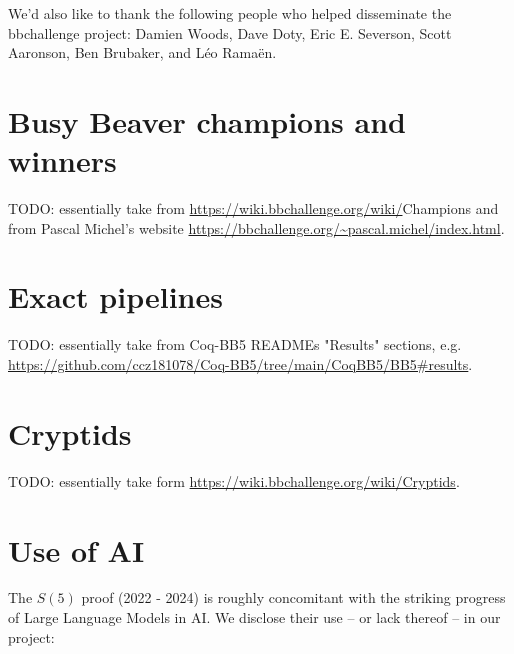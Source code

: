 \documentclass[a4paper,british]{article}
\theoremstyle{definition} %
\numberwithin{equation}{section}
\theoremstyle{definition} %
\newcommand{\ts}[1]{{\color{red}#1}}
\newcommand{\CoqBB}{Coq-BB5\xspace}
\begin{document}
We'd also like to thank the following people who helped disseminate the bbchallenge project: Damien Woods, Dave Doty, Eric E. Severson, Scott Aaronson, Ben Brubaker, and Léo Ramaën.
\newpage
\section{Busy Beaver champions and winners}\label{app:lowerbounds}

\ts{TODO: essentially take from \url{https://wiki.bbchallenge.org/wiki/}Champions and from Pascal Michel's website \url{https://bbchallenge.org/~pascal.michel/index.html}.}

\section{Exact pipelines}\label{app:pipelines}

\ts{TODO: essentially take from \CoqBB READMEs "Results" sections, e.g. \url{https://github.com/ccz181078/Coq-BB5/tree/main/CoqBB5/BB5\#results}.}

\section{Cryptids}\label{app:cryptids}

\ts{TODO: essentially take form \url{https://wiki.bbchallenge.org/wiki/Cryptids}.}

\section{Use of AI}

The $S(5)$ proof (2022 - 2024) is roughly concomitant with the striking progress of Large Language Models in AI. We disclose their use -- or lack thereof -- in our project:
\end{document}
